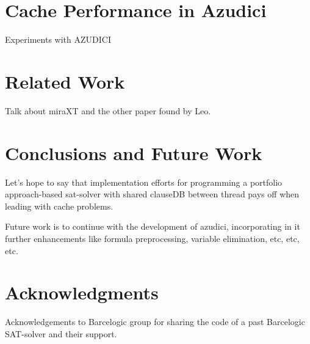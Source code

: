 \documentclass{llncs}
\begin{document}
\section{Cache Performance in Azudici}

Experiments with AZUDICI

\section{Related Work}

Talk about miraXT and the other paper found by Leo.

\section{Conclusions and Future Work}

Let's hope to say that implementation efforts for programming a
portfolio approach-based sat-solver with shared clauseDB between
thread pays off when leading with cache problems.

Future work is to continue with the development of  azudici,
incorporating in it further enhancements like formula preprocessing,
variable elimination, etc, etc, etc.

\section*{Acknowledgments}

Acknowledgements to Barcelogic group for sharing the code of a past
Barcelogic SAT-solver and their support.




\end{document}
